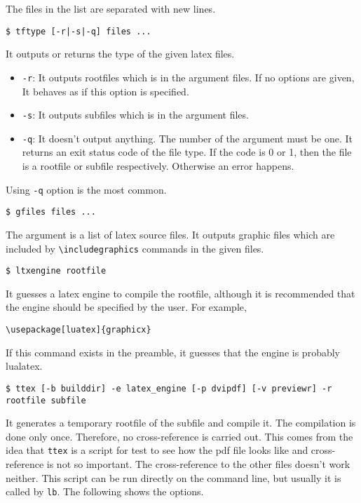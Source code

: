 The files in the list are separated with new lines.

\begin{verbatim}
$ tftype [-r|-s|-q] files ...
\end{verbatim}

It outputs or returns the type of the given latex files.

\begin{itemize}
\tightlist
\item
  \texttt{-r}: It outputs rootfiles which is in the argument files. If
  no options are given, It behaves as if this option is specified.
\item
  \texttt{-s}: It outputs subfiles which is in the argument files.
\item
  \texttt{-q}: It doesn't output anything. The number of the argument
  must be one. It returns an exit status code of the file type. If the
  code is 0 or 1, then the file is a rootfile or subfile respectively.
  Otherwise an error happens.
\end{itemize}

Using \texttt{-q} option is the most common.

\begin{verbatim}
$ gfiles files ...
\end{verbatim}

The argument is a list of latex source files. It outputs graphic files
which are included by \texttt{\textbackslash{}includegraphics} commands
in the given files.

\begin{verbatim}
$ ltxengine rootfile
\end{verbatim}

It guesses a latex engine to compile the rootfile, although it is
recommended that the engine should be specified by the user. For
example,

\begin{verbatim}
\usepackage[luatex]{graphicx}
\end{verbatim}

If this command exists in the preamble, it guesses that the engine is
probably lualatex.

\begin{verbatim}
$ ttex [-b builddir] -e latex_engine [-p dvipdf] [-v previewr] -r rootfile subfile
\end{verbatim}

It generates a temporary rootfile of the subfile and compile it. The
compilation is done only once. Therefore, no cross-reference is carried
out. This comes from the idea that \texttt{ttex} is a script for test to
see how the pdf file looks like and cross-reference is not so important.
The cross-reference to the other files doesn't work neither. This script
can be run directly on the command line, but usually it is called by
\texttt{lb}. The following shows the options.

